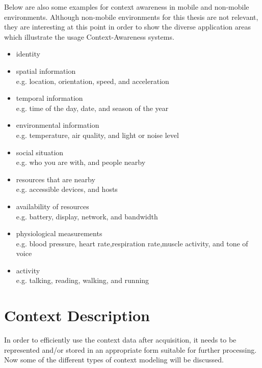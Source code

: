 Below are also some examples for context awareness in mobile and non-mobile environments. Although non-mobile environments for this thesis are not relevant, they are interesting at this point in order to show the diverse application areas which illustrate the usage Context-Awareness systems.

\begin{itemize}
\item identity
\item spatial information\\
e.g. location, orientation, speed, and acceleration
\item temporal information\\
e.g. time of the day, date, and season of the year
\item environmental information\\
e.g. temperature, air quality, and light or noise level
\item social situation\\
e.g. who you are with, and people nearby
\item resources that are nearby\\
e.g. accessible devices, and hosts
\item availability of resources\\
e.g. battery, display, network, and bandwidth
\item physiological measurements\\
e.g. blood pressure, heart rate,respiration rate,muscle activity, and tone of voice
\item activity\\
e.g. talking, reading, walking, and running
\end{itemize}

\section{Context Description\label{sec:back_con_de}}
In order to efficiently use the context data after acquisition, it needs to be represented and/or stored in an appropriate form suitable for further processing. Now some of the different types of context modeling will be discussed.

